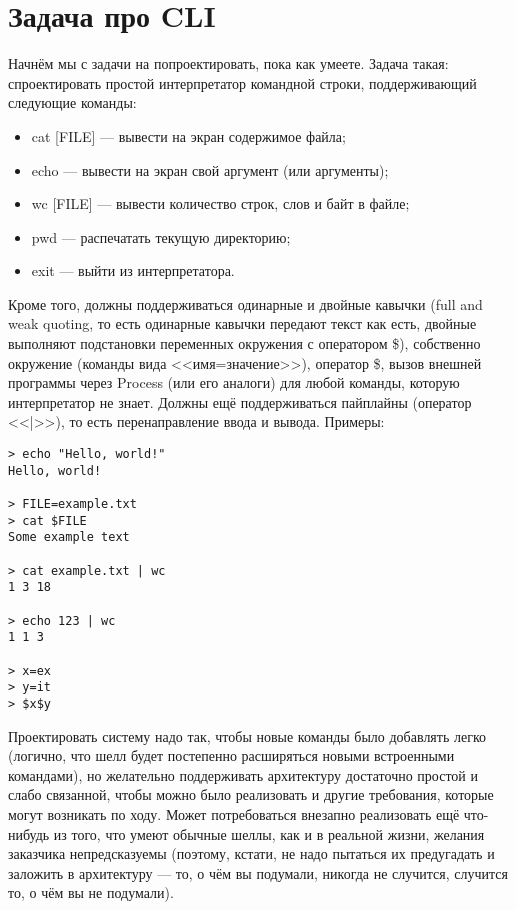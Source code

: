 \documentclass{../../text-style}
\begin{document}
\maketitle
\thispagestyle{empty}

\section{Задача про CLI}

Начнём мы с задачи на попроектировать, пока как умеете. Задача такая: спроектировать простой интерпретатор командной строки, поддерживающий следующие команды:

\begin{itemize}
    \item cat [FILE] --- вывести на экран содержимое файла;
    \item echo --- вывести на экран свой аргумент (или аргументы);
    \item wc [FILE] --- вывести количество строк, слов и байт в файле;
    \item pwd --- распечатать текущую директорию;
    \item exit --- выйти из интерпретатора.
\end{itemize}

Кроме того, должны поддерживаться одинарные и двойные кавычки (full and weak quoting, то есть одинарные кавычки передают текст как есть, двойные выполняют подстановки переменных окружения с оператором \$), собственно окружение (команды вида <<имя=значение>>), оператор \$, вызов внешней программы через Process (или его аналоги) для любой команды, которую интерпретатор не знает. Должны ещё поддерживаться пайплайны (оператор <<|>>), то есть перенаправление ввода и вывода. Примеры:

\begin{verbatim}
> echo "Hello, world!"
Hello, world!

> FILE=example.txt
> cat $FILE
Some example text

> cat example.txt | wc
1 3 18

> echo 123 | wc
1 1 3

> x=ex
> y=it
> $x$y
\end{verbatim}

Проектировать систему надо так, чтобы новые команды было добавлять легко (логично, что шелл будет постепенно расширяться новыми встроенными командами), но желательно поддерживать архитектуру достаточно простой и слабо связанной, чтобы можно было реализовать и другие требования, которые могут возникать по ходу. Может потребоваться внезапно реализовать ещё что-нибудь из того, что умеют обычные шеллы, как и в реальной жизни, желания заказчика непредсказуемы (поэтому, кстати, не надо пытаться их предугадать и заложить в архитектуру --- то, о чём вы подумали, никогда не случится, случится то, о чём вы не подумали).
\end{document}
